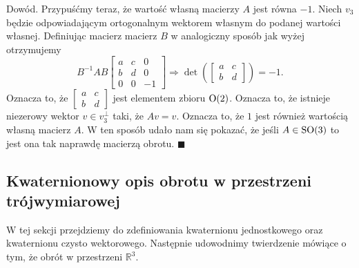 \documentclass[a4paper,twoside,11pt,reqno]{mwrep}
\theoremstyle{plain} \newtheorem{twr}{Twierdzenie}
\theoremstyle{plain} \newtheorem{lem}{Lemat}
\theoremstyle{definition} \newtheorem{defi}{Definicja}
\theoremstyle{remark} \newtheorem*{wni}{Wniosek}
\theoremstyle{definition} \newtheorem{uwaga}{Uwaga}
\theoremstyle{definition}\newtheorem{prz}{Przykład}
\newenvironment{dowod}{\par\vspace{0.1cm}\par{\sc Dowód.}}{\hfill $\blacksquare$\par\vspace{0.4cm}\par}
\begin{document}
\begin{dowod}
Przypuśćmy teraz, że wartość własną macierzy $A$ jest równa $-1$. Niech $v_3$ będzie odpowiadającym
ortogonalnym wektorem własnym do podanej wartości własnej. Definiując macierz macierz $B$ w analogiczny
sposób jak wyżej otrzymujemy 
  $$B^{-1}AB\begin{bmatrix}
a&c   & 0\\
b&d & 0\\
0&0&-1
\end{bmatrix}\Longrightarrow \det\left(\begin{bmatrix}
a&c \\
b&d 
\end{bmatrix} \right) =-1.$$
Oznacza to, że $\begin{bmatrix}
a&c \\
b&d 
\end{bmatrix}$ jest elementem zbioru $\textup{O}(2)$. Oznacza to, że istnieje niezerowy wektor 
$v\in v^\perp_3$ taki, że $Av=v$. Oznacza  to, że $1$ jest również wartością własną macierz $A$.
W ten sposób udało nam się pokazać, że jeśli $A\in\textup{SO}(3)$ to jest ona tak naprawdę macierzą
obrotu.  
\end{dowod}
\subsection{Kwaternionowy opis obrotu w przestrzeni trójwymiarowej}
W tej sekcji przejdziemy do zdefiniowania kwaternionu jednostkowego
oraz kwaternionu czysto wektorowego. Następnie udowodnimy twierdzenie mówiące o tym,
że obrót w przestrzeni $\mathbb{R}^3$.
\end{document}
